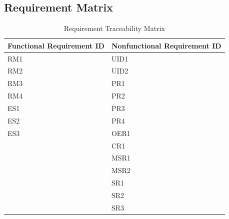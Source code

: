 \documentclass[12pt]{article}
\begin{document}
\subsection{Requirement Matrix}
\begin{table}[H]
    \begin{tabular}{|p{}| p{}|}

        \hline Functional Requirement ID & Nonfunctional Requirement ID \\

        \hline RM1                       & UID1                         \\

        \hline RM2                       & UID2                         \\
        \hline RM3                       & PR1                          \\
        \hline RM4                       & PR2                          \\
        \hline ES1                       & PR3                          \\
        \hline ES2                       & PR4                          \\
        \hline ES3                       & OER1                         \\
        \hline                           & CR1                          \\
        \hline                           & MSR1                         \\
        \hline                           & MSR2                         \\
        \hline                           & SR1                          \\
        \hline                           & SR2                          \\
        \hline                           & SR3                          \\


        \hline
    \end{tabular}
    \caption{Requirement Traceability Matrix}
\end{table}
\end{document}
